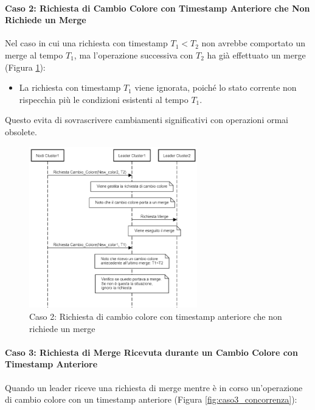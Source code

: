 \documentclass[12pt, a4paper]{report}
\begin{document}
\newpage
\paragraph{Caso 2: Richiesta di Cambio Colore con Timestamp Anteriore che Non Richiede un Merge}\label{par:case2}

Nel caso in cui una richiesta con timestamp $T_1 < T_2$ non avrebbe comportato un merge al tempo $T_1$, ma l'operazione successiva con $T_2$ ha già effettuato un merge (Figura \ref{fig:caso2_concorrenza}):

\begin{itemize}
    \item La richiesta con timestamp $T_1$ viene ignorata, poiché lo stato corrente non rispecchia più le condizioni esistenti al tempo $T_1$.
\end{itemize}

Questo evita di sovrascrivere cambiamenti significativi con operazioni ormai obsolete.

\begin{figure}[H]
    \centering
    \includegraphics[width=0.65\textwidth,align=t]{images/concorrenza/caso2.png}
    \caption{Caso 2: Richiesta di cambio colore con timestamp anteriore che non richiede un merge}
    \label{fig:caso2_concorrenza}
\end{figure}

\newpage
\paragraph{Caso 3: Richiesta di Merge Ricevuta durante un Cambio Colore con Timestamp Anteriore}\label{par:case3}

Quando un leader riceve una richiesta di merge mentre è in corso un'operazione di cambio colore con un timestamp anteriore (Figura \ref{fig:caso3_concorrenza}):
\end{document}
